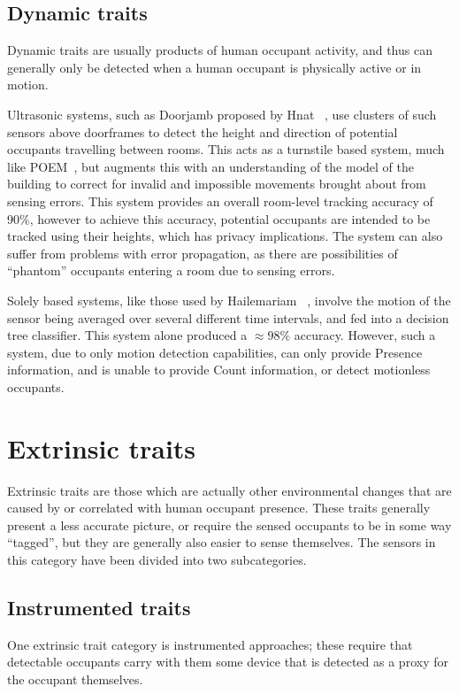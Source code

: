 \documentclass[../thesis/thesis.tex]{subfiles}
\begin{document}
\subsection{Dynamic traits}
\label{subsubsec:litreview:sensors:intrinsic:dynamic}
Dynamic traits are usually products of human occupant activity, and thus can generally only be detected when a human occupant is physically active or in motion.

Ultrasonic systems, such as Doorjamb proposed by Hnat \etal~\cite{hnat2012doorjamb}, use clusters of such sensors above doorframes to detect the height and direction of potential occupants travelling between rooms. This acts as a turnstile based system, much like POEM~\cite{erickson2013poem}, but augments this with an understanding of the model of the building to correct for invalid and impossible movements brought about from sensing errors. This system provides an overall room-level tracking accuracy of 90\%, however to achieve this accuracy, potential occupants are intended to be tracked using their heights, which has privacy implications. The system can also suffer from problems with error propagation, as there are possibilities of ``phantom'' occupants entering a room due to sensing errors.

Solely \pir based systems, like those used by Hailemariam \etal~\cite{hailemariam2011real}, involve the motion of the sensor being averaged over several different time intervals, and fed into a decision tree classifier. This \pir system alone produced a $\approx98\%$ accuracy. However, such a system, due to only motion detection capabilities, can only provide Presence information, and is unable to provide Count information, or detect motionless occupants.

\section{Extrinsic traits}
\label{subsec:litreview:sensors:extrinsic}
Extrinsic traits are those which are actually other environmental changes that are caused by or correlated with human occupant presence. These traits generally present a less accurate picture, or require the sensed occupants to be in some way ``tagged'', but they are generally also easier to sense themselves. The sensors in this category have been divided into two subcategories.

\subsection{Instrumented traits}
\label{subsubsec:litreview:sensors:extrinsic:instrumented}
One extrinsic trait category is instrumented approaches; these require that detectable occupants carry with them some device that is detected as a proxy for the occupant themselves.
\end{document}
